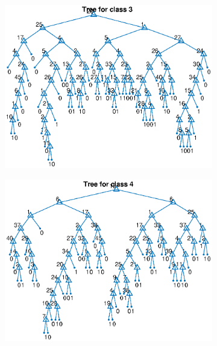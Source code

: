 \documentclass{article}
\begin{document}
\begin{figure}
\begin{subfigure}[b]{.49\textwidth}
   \includegraphics[width=\textwidth]{tree3.eps}
 \end{subfigure}
 \begin{subfigure}[b]{.49\textwidth}
   \includegraphics[width=\textwidth]{tree4.eps}
 \end{subfigure}
 \begin{subfigure}[b]{.49\textwidth}

\end{subfigure}
\end{figure}
\end{document}
